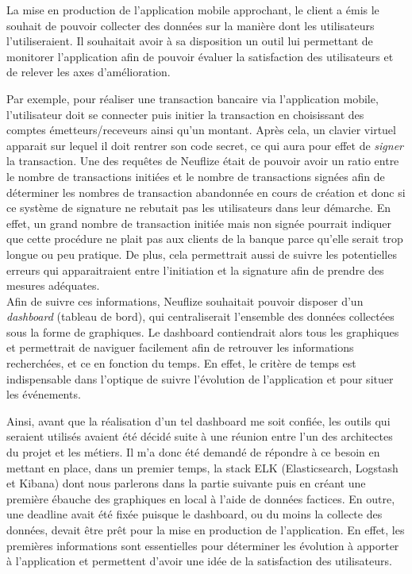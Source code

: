 	La mise en production de l'application mobile approchant, le client a émis le souhait de pouvoir collecter des données sur la manière dont les utilisateurs l'utiliseraient. Il souhaitait avoir à sa disposition un outil lui permettant de monitorer l'application afin de pouvoir évaluer la satisfaction des utilisateurs et de relever les axes d'amélioration. 
	
	Par exemple, pour réaliser une transaction bancaire via l'application mobile, l'utilisateur doit se connecter puis initier la transaction en choisissant des comptes émetteurs/receveurs ainsi qu'un montant. Après cela, un clavier virtuel apparait sur lequel il doit rentrer son code secret, ce qui aura pour effet de \textit{signer} la transaction. Une des requêtes de Neuflize était de pouvoir avoir un ratio entre le nombre de transactions initiées et le nombre de transactions signées afin de déterminer les nombres de transaction abandonnée en cours de création et donc si ce système de signature ne rebutait pas les utilisateurs dans leur démarche. En effet, un grand nombre de transaction initiée mais non signée pourrait indiquer que cette procédure ne plait pas aux clients de la banque parce qu'elle serait trop longue ou peu pratique. De plus, cela permettrait aussi de suivre les potentielles erreurs qui apparaitraient entre l'initiation et la signature afin de prendre des mesures adéquates. \\
	
	Afin de suivre ces informations, Neuflize souhaitait pouvoir disposer d'un \textit{dashboard} (tableau de bord), qui centraliserait l'ensemble des données collectées sous la forme de graphiques. Le dashboard contiendrait alors tous les graphiques et permettrait de naviguer facilement afin de retrouver les informations recherchées, et ce en fonction du temps. En effet, le critère de temps est indispensable dans l'optique de suivre l'évolution de l'application et pour situer les événements.
	
	Ainsi, avant que la réalisation d'un tel dashboard me soit confiée, les outils qui seraient utilisés avaient été décidé suite à une réunion entre l'un des architectes du projet et les métiers. Il m'a donc été demandé de répondre à ce besoin en mettant en place, dans un premier temps, la stack ELK (Elasticsearch, Logstash et Kibana) dont nous parlerons dans la partie suivante puis en créant une première ébauche des graphiques en local à l'aide de données factices. En outre, une deadline avait été fixée puisque le dashboard, ou du moins la collecte des données, devait être prêt pour la mise en production de l'application. En effet, les premières informations sont essentielles pour déterminer les évolution à apporter à l'application et permettent d'avoir une idée de la satisfaction des utilisateurs. \\
	
